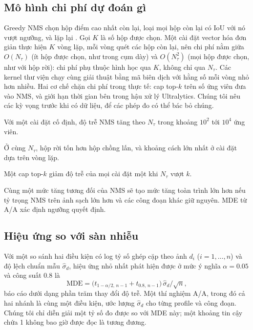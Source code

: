 \documentclass[a4paper,fleqn]{cas-dc}
\newcommand{\Ntau}{N_{\tau}}
\begin{document}
\subsection{Mô hình chi phí dự đoán gì}
Greedy NMS chọn hộp điểm cao nhất còn lại, loại mọi hộp còn lại có IoU với nó vượt ngưỡng, và lặp lại \cite{neubeck2006nms}. Gọi $K$ là số hộp được chọn. Một cài đặt vector hóa đơn giản thực hiện $K$ vòng lặp, mỗi vòng quét các hộp còn lại, nên chi phí nằm giữa $O(\Ntau)$ (ít hộp được chọn, như trong cụm dày) và $O(\Ntau^2)$ (mọi hộp được chọn, như với hộp rời): chi phí phụ thuộc hình học qua $K$, không chỉ qua $\Ntau$. Các kernel thư viện chạy cùng giải thuật bằng mã biên dịch với hằng số mỗi vòng nhỏ hơn nhiều. Hai cơ chế chặn chi phí trong thực tế: cap top-$k$ trên số ứng viên đưa vào NMS, và giới hạn thời gian bên trong hậu xử lý Ultralytics. Chúng tôi nêu các kỳ vọng trước khi có dữ liệu, để các phép đo có thể bác bỏ chúng.
\begin{description}[leftmargin=2.5em,labelwidth=2.2em,itemsep=2pt]
\item[H1] Với một cài đặt cố định, độ trễ NMS tăng theo $\Ntau$ trong khoảng $10^2$ tới $10^4$ ứng viên.
\item[H2] Ở cùng $\Ntau$, hộp rời tốn hơn hộp chồng lấn, và khoảng cách lớn nhất ở cài đặt dựa trên vòng lặp.
\item[H3] Một cap top-$k$ giảm độ trễ của mọi cài đặt một khi $\Ntau$ vượt $k$.
\item[H4] Cùng một mức tăng tương đối của NMS sẽ tạo mức tăng toàn trình lớn hơn nếu tỷ trọng NMS trên ảnh sạch lớn hơn và các công đoạn khác giữ nguyên. MDE từ A/A xác định ngưỡng quyết định.
\end{description}

\subsection{Hiệu ứng so với sàn nhiễu}
Với một so sánh hai điều kiện có log tỷ số ghép cặp theo ảnh $d_i$ ($i=1,\dots,n$) và độ lệch chuẩn mẫu $\hat\sigma_d$, hiệu ứng nhỏ nhất phát hiện được ở mức ý nghĩa $\alpha=0.05$ và công suất $0.8$ là
\begin{equation}
\mathrm{MDE}=\bigl(t_{1-\alpha/2,\,n-1}+t_{0.8,\,n-1}\bigr)\,\hat\sigma_d/\sqrt{n},
\end{equation}
báo cáo dưới dạng phần trăm thay đổi độ trễ. Một thí nghiệm A/A, trong đó cả hai nhánh là cùng một điều kiện, ước lượng $\hat\sigma_d$ cho từng profile và công đoạn. Chúng tôi chỉ diễn giải một tỷ số đo được so với MDE này; một khoảng tin cậy chứa 1 không bao giờ được đọc là tương đương.
\end{document}
